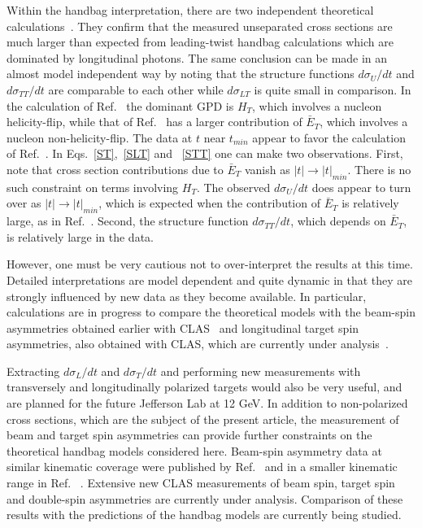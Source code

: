 \documentclass[prc,floatfix,twocolumn,superscriptaddress,letter]{revtex4}
\begin{document}
Within the handbag interpretation, there are two independent theoretical calculations~\cite{GK-ps-11, Goldstein:2010gu}. They confirm that the  measured unseparated cross sections are much larger than expected from leading-twist handbag calculations which are dominated by longitudinal photons.
The same conclusion can be made in an almost model independent way by noting that the structure functions $d\sigma_U/dt$ and $d\sigma_{TT}/dt$ are  comparable to each other while $d\sigma_{LT}$ is quite small in comparison.  
In the calculation of Ref.~\cite{Goldstein:2010gu} 
the dominant  GPD is $H_T$, which involves a nucleon helicity-flip, while that of   Ref.~\cite{GK-ps-11} has a larger contribution of  $\bar E_T$, which involves a nucleon non-helicity-flip. The data at $t$ near $t_{min}$ appear to favor the calculation of Ref.~\cite{GK-ps-11}.  In Eqs.~\ref{ST},~\ref{SLT} and ~\ref{STT} one  can make two observations. First, note that cross section contributions due to $\bar E_T$ vanish as $|t|\to |t|_{min}$.  There is no such constraint on terms involving $H_T$.  The observed  $d\sigma_U/dt$ does appear to turn over as  $|t| \to |t|_{min}$, which is expected when the contribution of $\bar E_T$ is relatively large, as in Ref.~\cite{GK-ps-11}. Second, the structure function $d\sigma_{TT}/dt$, which  depends on $\bar E_T$, is relatively large in the data. 

However, one must be very cautious not to over-interpret the results at this time. Detailed interpretations are model dependent and quite dynamic in that they are strongly influenced by new data as they become available. In particular, calculations are in progress to compare the theoretical models  with the 
beam-spin asymmetries obtained earlier with CLAS~\cite{demasi} and longitudinal target spin asymmetries, also obtained with CLAS, which are currently under analysis~\cite{kim}. 

Extracting $d\sigma_L/dt$ and  $d\sigma_T/dt$  and performing new measurements with transversely  and longitudinally polarized targets would also be very useful, and are planned for the future Jefferson Lab at 12 GeV.
In addition to non-polarized cross sections, which are the subject of the present article,
the measurement of beam and target spin asymmetries can provide further  constraints 
on the theoretical handbag models considered here. Beam-spin asymmetry data at similar 
kinematic coverage were published by Ref.~ \cite{demasi} and in a smaller 
kinematic range in Ref.~ \cite{Hall-A-pi0}. Extensive new CLAS measurements of beam spin, target spin 
and double-spin asymmetries are currently under analysis. Comparison of 
these results  with the predictions of the handbag models are currently being studied. 
\end{document}
